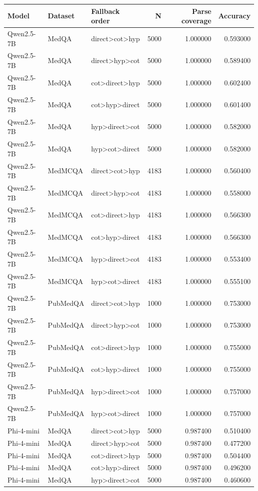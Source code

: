 \begin{tabular}{lllrrr}
\toprule
Model & Dataset & Fallback order & N & Parse coverage & Accuracy \\
\midrule
Qwen2.5-7B & MedQA & direct>cot>hyp & 5000 & 1.000000 & 0.593000 \\
Qwen2.5-7B & MedQA & direct>hyp>cot & 5000 & 1.000000 & 0.589400 \\
Qwen2.5-7B & MedQA & cot>direct>hyp & 5000 & 1.000000 & 0.602400 \\
Qwen2.5-7B & MedQA & cot>hyp>direct & 5000 & 1.000000 & 0.601400 \\
Qwen2.5-7B & MedQA & hyp>direct>cot & 5000 & 1.000000 & 0.582000 \\
Qwen2.5-7B & MedQA & hyp>cot>direct & 5000 & 1.000000 & 0.582000 \\
Qwen2.5-7B & MedMCQA & direct>cot>hyp & 4183 & 1.000000 & 0.560400 \\
Qwen2.5-7B & MedMCQA & direct>hyp>cot & 4183 & 1.000000 & 0.558000 \\
Qwen2.5-7B & MedMCQA & cot>direct>hyp & 4183 & 1.000000 & 0.566300 \\
Qwen2.5-7B & MedMCQA & cot>hyp>direct & 4183 & 1.000000 & 0.566300 \\
Qwen2.5-7B & MedMCQA & hyp>direct>cot & 4183 & 1.000000 & 0.553400 \\
Qwen2.5-7B & MedMCQA & hyp>cot>direct & 4183 & 1.000000 & 0.555100 \\
Qwen2.5-7B & PubMedQA & direct>cot>hyp & 1000 & 1.000000 & 0.753000 \\
Qwen2.5-7B & PubMedQA & direct>hyp>cot & 1000 & 1.000000 & 0.753000 \\
Qwen2.5-7B & PubMedQA & cot>direct>hyp & 1000 & 1.000000 & 0.755000 \\
Qwen2.5-7B & PubMedQA & cot>hyp>direct & 1000 & 1.000000 & 0.755000 \\
Qwen2.5-7B & PubMedQA & hyp>direct>cot & 1000 & 1.000000 & 0.757000 \\
Qwen2.5-7B & PubMedQA & hyp>cot>direct & 1000 & 1.000000 & 0.757000 \\
Phi-4-mini & MedQA & direct>cot>hyp & 5000 & 0.987400 & 0.510400 \\
Phi-4-mini & MedQA & direct>hyp>cot & 5000 & 0.987400 & 0.477200 \\
Phi-4-mini & MedQA & cot>direct>hyp & 5000 & 0.987400 & 0.504400 \\
Phi-4-mini & MedQA & cot>hyp>direct & 5000 & 0.987400 & 0.496200 \\
Phi-4-mini & MedQA & hyp>direct>cot & 5000 & 0.987400 & 0.460600 \\

\end{tabular}
